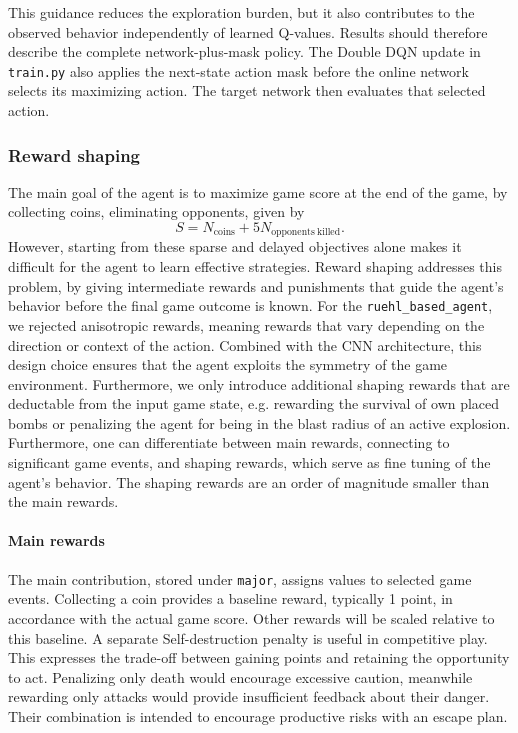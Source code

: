 \documentclass[11pt,a4paper]{article}
\begin{document}
This guidance reduces the exploration burden, but it also contributes to
the observed behavior independently of learned Q-values. Results should
therefore describe the complete network-plus-mask policy. The Double DQN
update in \texttt{train.py} also applies the next-state
action mask before the online network selects its maximizing action. The
target network then evaluates that selected action.

\subsubsection{Reward shaping}
\label{sec:reward-design}
The main goal of the agent is to maximize game score at the end of the game, by collecting coins, eliminating opponents, given by
\begin{equation}
S=N_{\mathrm{coins}}+5N_{\mathrm{opponents\ killed}}.
\end{equation}
However, starting from these sparse and delayed objectives alone makes it difficult for the agent to learn effective strategies.
Reward shaping addresses this problem, by giving intermediate rewards and punishments that guide the agent's behavior before the final game outcome is known.
For the \texttt{ruehl\_based\_agent}, we rejected anisotropic rewards, meaning rewards that vary depending on the direction or context of the action. 
Combined with the CNN architecture, this design choice ensures that the agent exploits the symmetry of the game environment.
Furthermore, we only introduce additional shaping rewards that are deductable from the input game state, e.g. rewarding the survival of own placed bombs or penalizing the agent for being in the blast radius of an active explosion.
Furthermore, one can differentiate between main rewards, connecting to significant game events, and shaping rewards, which serve as fine tuning of the agent's behavior. The shaping rewards are an order of magnitude smaller than the main rewards.

\paragraph{Main rewards}
The main contribution, stored under \texttt{major},
assigns values to selected game events.
Collecting a coin provides a baseline reward, typically 1 point, in accordance with the actual game score.
Other rewards will be scaled relative to this baseline.
A separate Self-destruction penalty is useful in competitive play. 
This expresses the trade-off between gaining points and retaining the opportunity to act. 
Penalizing only death would encourage excessive caution, meanwhile rewarding only attacks would provide insufficient feedback about their danger. 
Their combination is intended to encourage productive risks with an escape plan.
\end{document}
